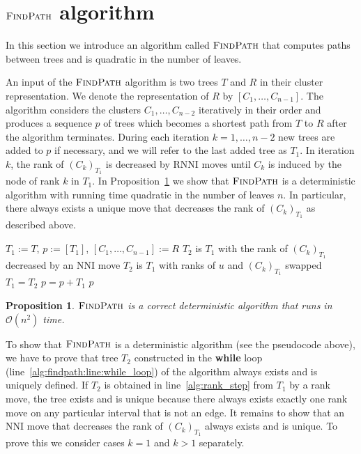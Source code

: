 \documentclass[11pt]{amsart}
\newtheorem{proposition}{Proposition}
\newcommand{\rnni}{\mathrm{RNNI}}
\newcommand{\findpath}{\textsc{FindPath}}
\newcommand{\rank}{\mathrm{rank}}
\newcommand{\nni}{\mathrm{NNI}}
\renewcommand{\O}{\mathcal O}
\begin{document}
\section{$\findpath$ algorithm}
\label{sec:rnni_complexity}

In this section we introduce an algorithm called $\findpath$ that computes paths between trees and is quadratic in the number of leaves.

An input of the $\findpath$ algorithm is two trees $T$ and $R$ in their cluster representation.
We denote the representation of $R$ by $[C_1, \ldots, C_{n-1}]$.
The algorithm considers the clusters $C_1, \ldots, C_{n-2}$ iteratively in their order and produces a sequence $p$ of trees which becomes a shortest path from $T$ to $R$ after the algorithm terminates.
During each iteration $k = 1, \ldots, n-2$ new trees are added to $p$ if necessary, and we will refer to the last added tree as $T_1$.
In iteration $k$, the rank of $(C_{k})_{T_1}$ is decreased by $\rnni$ moves until $C_k$ is induced by the node of rank $k$ in $T_1$.
In Proposition~\ref{prop:fp_correctness} we show that $\findpath$ is a deterministic algorithm with running time quadratic in the number of leaves $n$.
In particular, there always exists a unique move that decreases the rank of $(C_{k})_{T_1}$ as described above.

\begin{algorithm}[H]
\caption{$\findpath$($T,R$)}
\begin{algorithmic}[1]
\STATE $T_1 := T$, $p := [T_1]$, $[C_1, \ldots, C_{n-1}] := R$
\label{alg:findpath:line:for_loop}
	\WHILE {$\rank((C_k)_{T_1})>k$}
	\label{alg:findpath:line:while_loop}
			\STATE $T_2$ is $T_1$ with the rank of $(C_k)_{T_1}$ decreased by an $\nni$ move
			\label{alg:nni_step}
		\ELSE
			\STATE $T_2$ is $T_1$ with ranks of $u$ and $(C_k)_{T_1}$ swapped
			\label{alg:rank_step}
		\ENDIF
		\STATE $T_1 = T_2$
		\STATE $p = p+T_1$
	\ENDWHILE
\ENDFOR
\RETURN $p$
\end{algorithmic}
\end{algorithm}

\begin{proposition}
$\findpath$ is a correct deterministic algorithm that runs in $\O(n^2)$ time.
\label{prop:fp_correctness}
\end{proposition}

\proof
To show that $\findpath$ is a deterministic algorithm (see the pseudocode above), we have to prove that tree $T_2$ constructed in the \textbf{while} loop (line~\ref{alg:findpath:line:while_loop}) of the algorithm always exists and is uniquely defined.
If $T_2$ is obtained in line~\ref{alg:rank_step} from $T_1$ by a rank move, the tree exists and is unique because there always exists exactly one rank move on any particular interval that is not an edge.
It remains to show that an $\nni$ move that decreases the rank of $(C_k)_{T_1}$ always exists and is unique.
To prove this we consider cases $k = 1$ and $k > 1$ separately.
\end{document}
